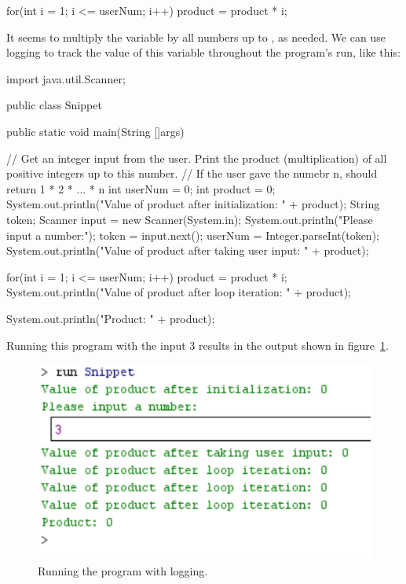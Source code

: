 \begin{code}
for(int i = 1; i <= userNum; i++){
    product = product * i;
}
\end{code}

It seems to multiply the variable by all numbers up to , as needed. We can use logging to track the value of this variable throughout the program's run, like this:

\begin{code}
import java.util.Scanner;

public class Snippet{
    public static void main(String []args){
        // Get an integer input from the user. Print the product (multiplication) of all positive integers up to this number.
        // If the user gave the numebr n, should return 1 * 2 * ... * n
        int userNum = 0;
        int product = 0;
        System.out.println("Value of product after initialization: " + product);
        String token;
        Scanner input = new Scanner(System.in);
        System.out.println("Please input a number:");
        token = input.next();
        userNum = Integer.parseInt(token);
        System.out.println("Value of product after taking user input: " + product);
        
        for(int i = 1; i <= userNum; i++){
            product = product * i;
            System.out.println("Value of product after loop iteration: " + product);
        }
        
        System.out.println("Product: " + product);
    }
}
\end{code}

Running this program with the input $3$ results in the output shown in figure~\ref{fig:logging}. 

\begin{figure}[h!]
\centering
\includegraphics[scale=0.8]{lectures/images/logging.PNG}
\caption{Running the program with logging.}
\label{fig:logging}
\end{figure}

